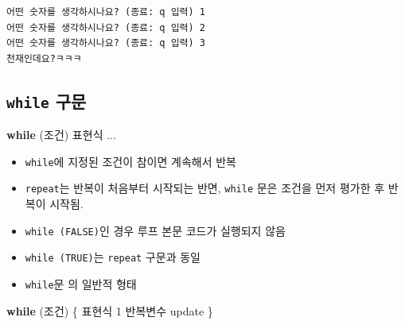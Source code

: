 \documentclass[
  11pt,
]{krantz}
\newenvironment{Shaded}{\begin{snugshade}}{\end{snugshade}}
\newcommand{\ControlFlowTok}[1]{\textcolor[rgb]{0.27,0.27,0.27}{\textbf{#1}}}
\newcommand{\DecValTok}[1]{\textcolor[rgb]{0.06,0.06,0.06}{#1}}
\newcommand{\NormalTok}[1]{#1}
\providecommand{\tightlist}{%
  \setlength{\itemsep}{0pt}\setlength{\parskip}{0pt}}
\begin{document}
\begin{verbatim}
어떤 숫자를 생각하시나요? (종료: q 입력) 1
어떤 숫자를 생각하시나요? (종료: q 입력) 2
어떤 숫자를 생각하시나요? (종료: q 입력) 3
천재인데요?ㅋㅋㅋ
\end{verbatim}

\hypertarget{while}{%
\subsection{\texorpdfstring{\textbf{\texttt{while} 구문}}{while 구문}}\label{while}}

\footnotesize

\begin{Shaded}
\begin{Highlighting}[]
\ControlFlowTok{while}\NormalTok{ (조건) 표현식 ...}
\end{Highlighting}
\end{Shaded}

\normalsize

\begin{itemize}
\tightlist
\item
  \texttt{while}에 지정된 조건이 참이면 계속해서 반복
\item
  \texttt{repeat}는 반복이 처음부터 시작되는 반면, \texttt{while} 문은 조건을 먼저 평가한 후 반복이 시작됨.
\item
  \texttt{while\ (FALSE)}인 경우 루프 본문 코드가 실행되지 않음
\item
  \texttt{while\ (TRUE)}는 \texttt{repeat} 구문과 동일
\item
  \texttt{while}문 의 일반적 형태
\end{itemize}

\footnotesize

\begin{Shaded}
\begin{Highlighting}[]
\ControlFlowTok{while}\NormalTok{ (조건) \{}
\NormalTok{  표현식 }\DecValTok{1}
\NormalTok{  반복변수 update}
\NormalTok{\}}
\end{Highlighting}
\end{Shaded}

\normalsize

\footnotesize
\end{document}
